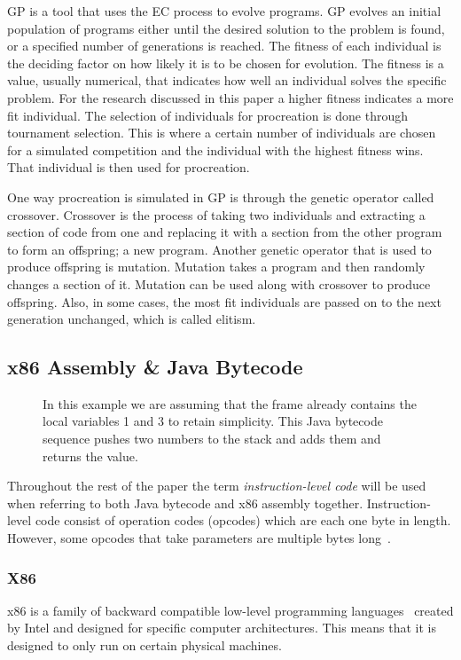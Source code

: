 \documentclass{sig-alternate}
\begin{document}
	GP is a tool that uses the EC process to evolve programs. GP evolves an initial population of programs either until the desired solution to the problem is found, or a specified number of generations is reached. The fitness of each individual is the deciding factor on how likely it is to be chosen for evolution. The fitness is a value, usually numerical, that indicates how well an individual solves the specific problem. For the research discussed in this paper a higher fitness indicates a more fit individual. The selection of individuals for procreation is done through tournament selection. This is where a certain number of individuals are chosen for a simulated competition and the individual with the highest fitness wins. That individual is then used for procreation.\par 	
	One way procreation is simulated in GP is through the genetic operator called crossover. Crossover is the process of taking two individuals and extracting a section of code from one and replacing it with a section from the other program to form an offspring; a new program. Another genetic operator that is used to produce offspring is mutation. Mutation takes a program and then randomly changes a section of it. Mutation can be used along with crossover to produce offspring. Also, in some cases, the most fit individuals are passed on to the next generation unchanged, which is called elitism.


\subsection{x86 Assembly \& Java Bytecode}

\begin{figure}
\centering
{}

\caption{In this example we are assuming that the frame already contains the local variables 1 and 3 to retain simplicity. This Java bytecode sequence pushes two numbers to the stack and adds them and returns the value.}
\label{stack}
\end{figure}


Throughout the rest of the paper the term \textit{instruction-level code} will be used when referring to both Java bytecode and x86 assembly together. Instruction-level code consist of operation codes (opcodes) which are each one byte in length. However, some opcodes that take parameters are multiple bytes long~\cite{JavaBytecode:2014,x86tomachine:2013}.

\subsubsection{X86}
x86 is a family of backward compatible low-level programming languages~\cite{x86assembly:2014} created by Intel and designed for specific computer architectures. This means that it is designed to only run on certain physical machines. 
\end{document}
